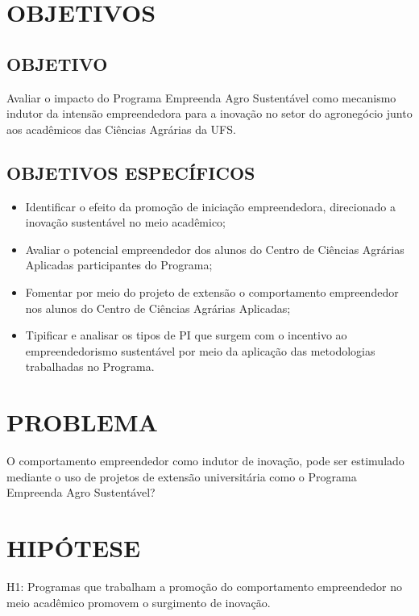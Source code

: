 \section{OBJETIVOS}

\subsection{OBJETIVO}

Avaliar o impacto do Programa Empreenda Agro Sustentável como mecanismo indutor da intensão empreendedora para a inovação no setor do agronegócio junto aos acadêmicos das Ciências Agrárias da UFS.



\subsection{OBJETIVOS ESPECÍFICOS}

\begin{itemize}
\item{Identificar o efeito da promoção de iniciação empreendedora, direcionado a inovação sustentável no meio acadêmico;}
\item {Avaliar o potencial empreendedor dos alunos do Centro de Ciências Agrárias Aplicadas participantes do Programa;
}
\item {Fomentar por meio do projeto de extensão o comportamento empreendedor nos alunos do Centro de Ciências Agrárias Aplicadas;}

\item {Tipificar e analisar os tipos de PI que surgem com o incentivo ao empreendedorismo sustentável por meio da aplicação das metodologias trabalhadas no Programa.}

\end{itemize}


\section{PROBLEMA}

O comportamento empreendedor como indutor de inovação, pode ser estimulado mediante o uso de projetos de extensão universitária como o Programa Empreenda Agro Sustentável? 


\section{HIPÓTESE}

H1: Programas que trabalham a promoção do comportamento empreendedor no meio acadêmico promovem o surgimento de inovação.

